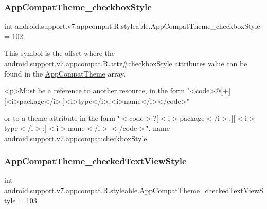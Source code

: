 \subsubsection{\texorpdfstring{App\+Compat\+Theme\+\_\+checkbox\+Style}{AppCompatTheme\_checkboxStyle}}
{\footnotesize\ttfamily int android.\+support.\+v7.\+appcompat.\+R.\+styleable.\+App\+Compat\+Theme\+\_\+checkbox\+Style = 102\hspace{0.3cm}{\ttfamily [static]}}

This symbol is the offset where the \hyperlink{classandroid_1_1support_1_1v7_1_1appcompat_1_1R_1_1attr_a8e18e9577e5b537ba3d5390332c30018}{android.\+support.\+v7.\+appcompat.\+R.\+attr\#checkbox\+Style} attribute\textquotesingle{}s value can be found in the \hyperlink{classandroid_1_1support_1_1v7_1_1appcompat_1_1R_1_1styleable_a5c42f89e8a410c323be34208d75c430b}{App\+Compat\+Theme} array.

\begin{DoxyVerb}      <p>Must be a reference to another resource, in the form "<code>@[+][<i>package</i>:]<i>type</i>:<i>name</i></code>"
\end{DoxyVerb}
 or to a theme attribute in the form \char`\"{}$<$code$>$?\mbox{[}$<$i$>$package$<$/i$>$\+:\mbox{]}\mbox{[}$<$i$>$type$<$/i$>$\+:\mbox{]}$<$i$>$name$<$/i$>$$<$/code$>$\char`\"{}.  name android.\+support.\+v7.\+appcompat\+:checkbox\+Style \mbox{\label{classandroid_1_1support_1_1v7_1_1appcompat_1_1R_1_1styleable_aa6468311a9d0b5f772dae98fbcf245cd}} 
\subsubsection{\texorpdfstring{App\+Compat\+Theme\+\_\+checked\+Text\+View\+Style}{AppCompatTheme\_checkedTextViewStyle}}
{\footnotesize\ttfamily int android.\+support.\+v7.\+appcompat.\+R.\+styleable.\+App\+Compat\+Theme\+\_\+checked\+Text\+View\+Style = 103\hspace{0.3cm}{\ttfamily [static]}}

